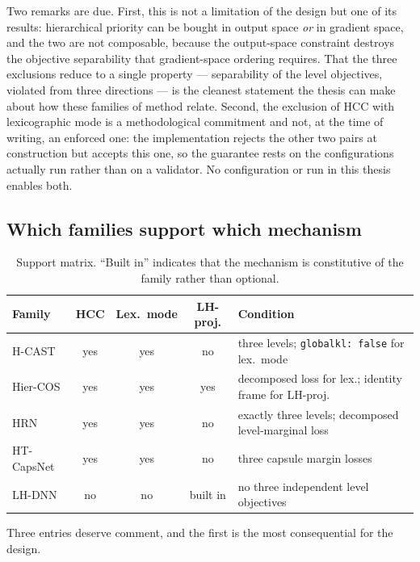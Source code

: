 Two remarks are due. First, this is not a limitation of the design but one of its
results: hierarchical priority can be bought in output space \emph{or} in gradient
space, and the two are not composable, because the output-space constraint
destroys the objective separability that gradient-space ordering requires. That
the three exclusions reduce to a single property --- separability of the level
objectives, violated from three directions --- is the cleanest statement the
thesis can make about how these families of method relate. Second, the exclusion
of HCC with lexicographic mode is a methodological commitment and not, at the time
of writing, an enforced one: the implementation rejects the other two pairs at
construction but accepts this one, so the guarantee rests on the configurations
actually run rather than on a validator. No configuration or run in this thesis
enables both.

\subsection{Which families support which mechanism}
\label{ssec:design_support}

\begin{table}[htbp]
\centering
\small
\begin{tabular}{@{}lccc l@{}}
\toprule
\textbf{Family} & \textbf{HCC} & \textbf{Lex.\ mode} & \textbf{LH-proj.} & \textbf{Condition} \\
\midrule
H-CAST   & yes & yes & no  & three levels; \texttt{globalkl:\ false} for lex.\ mode \\
Hier-COS & yes & yes & yes & decomposed loss for lex.; identity frame for LH-proj. \\
HRN      & yes & yes & no  & exactly three levels; decomposed level-marginal loss \\
HT-CapsNet & yes & yes & no & three capsule margin losses \\
LH-DNN   & no  & no  & built in & no three independent level objectives \\
\bottomrule
\end{tabular}
\caption{Support matrix. ``Built in'' indicates that the mechanism is constitutive
of the family rather than optional.}
\label{tab:framework_support}
\end{table}

Three entries deserve comment, and the first is the most consequential for the
design.

